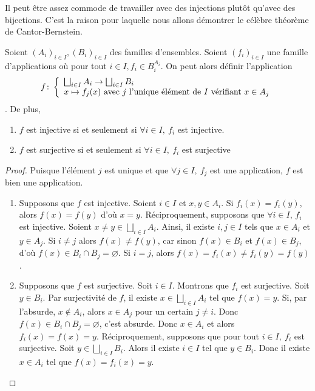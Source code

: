 Il peut être assez commode de travailler avec des injections plutôt qu'avec des bijections. C'est la raison pour laquelle nous allons démontrer le célèbre théorème de Cantor-Bernstein. 
\begin{lemme}[Recollement]\label{ens : CSB : recollement}
    Soient $(A_i)_{i\in I},(B_i)_{i\in I}$ des familles d'ensembles. Soient $(f_i)_{i\in I}$ une famille d'applications où pour tout $i\in I, f_i\in B_i^{A_i}$. On peut alors définir l'application $$f\colon \left\{\begin{array}{l}\bigsqcup_{i\in I}A_i\to \bigsqcup_{i\in I}B_i \\x\mapsto f_j(x) \text{ avec $j$ l'unique élément de $I$ vérifiant $x\in A_j$}\end{array}\right.$$.
    De plus, \begin{enumerate}
        \item $f$ est injective si et seulement si $\forall i \in I,\ f_i$ est injective.
        \item $f$ est surjective si et seulement si $\forall i \in I,\ f_i$ est surjective
    \end{enumerate} 
\end{lemme} 
\begin{proof}
    Puisque l'élément $j$ est unique et que $\forall j\in I,\ f_j$ est une application, $f$ est bien une application. 
    \begin{enumerate}
        \item Supposons que $f$ est injective. Soient $i\in I$ et $x,y\in A_i$. Si $f_i(x) = f_i(y)$, alors $f(x) = f(y)$ d'où $x=y$. Réciproquement, supposons que $\forall i\in I$, $f_i$ est injective. Soient $x\ne y\in \bigsqcup_{i\in I}A_i$. Ainsi, il existe $i,j\in I$ tels que $x\in A_i$ et $y\in A_j$. Si $i\ne j$ alors $f(x)\ne f(y)$, car sinon $f(x)\in B_i$ et $f(x)\in B_j$, d'où $f(x)\in B_i\cap B_j = \varnothing$. Si $i = j$, alors $f(x) = f_i(x)\ne f_i(y) = f(y)$.
        \item Supposons que $f$ est surjective. Soit $i\in I$. Montrons que $f_i$ est surjective. Soit $y\in B_i$. Par surjectivité de $f$, il existe $x\in \bigsqcup_{i\in I}A_i$ tel que $f(x) = y$. Si, par l'absurde, $x\notin A_i$, alors $x\in A_j$ pour un certain $j\ne i$. Donc $f(x)\in B_i\cap B_j = \varnothing$, c'est absurde. Donc $x\in A_i$ et alors $f_i(x) = f(x) = y$. Réciproquement, supposons que pour tout $i\in I,\ f_i$ est surjective. Soit $y\in\bigsqcup_{i\in I}B_i$. Alors il existe $i\in I$ tel que $y\in B_i$. Donc il existe $x\in A_i$ tel que $f(x) = f_i(x) = y$.
    \end{enumerate}
\end{proof}
   

